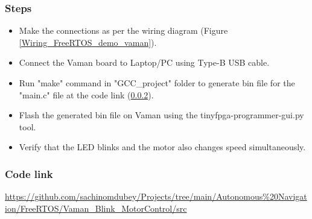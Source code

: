 \subsubsection{Steps}
\begin{itemize}
    \item Make the connections as per the wiring diagram (Figure \ref{Wiring_FreeRTOS_demo_vaman}).
    \item Connect the Vaman board to Laptop/PC using Type-B USB cable.
    \item Run "make" command in "GCC\_project" folder to generate bin file for the "main.c" file at the code link (\ref{Code_link_FreeRTOS_Vaman}).
    \item Flash the generated bin file on Vaman using the tinyfpga-programmer-gui.py tool. 
    \item Verify that the LED blinks and the motor also changes speed simultaneously.
\end{itemize}

\subsubsection{Code link} \label{Code_link_FreeRTOS_Vaman}
\begin{tcolorbox}
\url{https://github.com/sachinomdubey/Projects/tree/main/Autonomous\%20Navigation/FreeRTOS/Vaman_Blink_MotorControl/src}
\end{tcolorbox}

